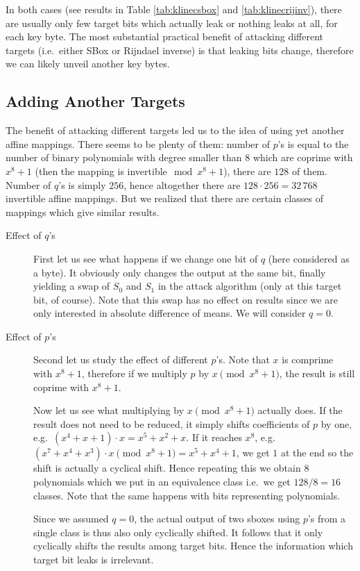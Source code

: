 In both cases (see results in Table \ref{tab:klinecsbox} and \ref{tab:klinecrijinv}), there are usually only few target bits which actually leak or nothing leaks at all, for each key byte. The most substantial practical benefit of attacking different targets (i.e.\ either SBox or Rijndael inverse) is that leaking bits change, therefore we can likely unveil another key bytes.

\subsection{Adding Another Targets}
\label{sec:16targets}

The benefit of attacking different targets led us to the idea of using yet another affine mappings. There seems to be plenty of them: number of $p$'s is equal to the number of binary polynomials with degree smaller than $8$ which are coprime with $x^8+1$ (then the mapping is invertible$\mod{x^8+1}$), there are $128$ of them. Number of $q$'s is simply $256$, hence altogether there are $128\cdot 256 = 32\,768$ invertible affine mappings. But we realized that there are certain classes of mappings which give similar results.

\begin{description}
\item[Effect of $q$'s]
First let us see what happens if we change one bit of $q$ (here considered as a byte). It obviously only changes the output at the same bit, finally yielding a swap of $S_0$ and $S_1$ in the attack algorithm (only at this target bit, of course). Note that this swap has no effect on results since we are only interested in absolute difference of means. We will consider $q = 0$.

\item[Effect of $p$'s]
Second let us study the effect of different $p$'s. Note that $x$ is comprime with $x^8+1$, therefore if we multiply $p$ by $x\pmod{x^8+1}$, the result is still coprime with $x^8+1$.

Now let us see what multiplying by $x\pmod{x^8+1}$ actually does. If the result does not need to be reduced, it simply shifts coefficients of $p$ by one, e.g.\ $(x^4 + x + 1) \cdot x = x^5 + x^2 + x$. If it reaches $x^8$, e.g.\ $(x^7 + x^4 + x^3) \cdot x \pmod{x^8+1} = x^5 + x^4 + 1$, we get $1$ at the end so the shift is actually a cyclical shift. Hence repeating this we obtain $8$ polynomials which we put in an equivalence class i.e.\ we get $128/8=16$ classes. Note that the same happens with bits representing polynomials.

Since we assumed $q = 0$, the actual output of two sboxes using $p$'s from a single class is thus also only cyclically shifted. It follows that it only cyclically shifts the results among target bits. Hence the information which target bit leaks is irrelevant.
\end{description}


